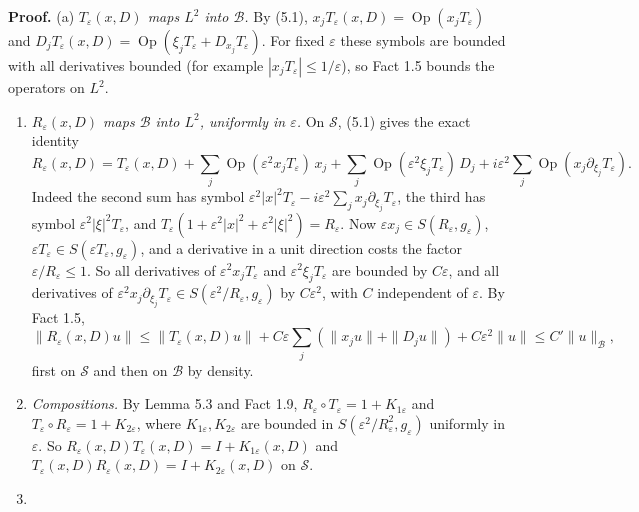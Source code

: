 \documentclass[
  11pt,
]{article}
\begin{document}
\textbf{Proof.} (a) \emph{\(T_\varepsilon(x,D)\) maps \(L^2\) into
\(\mathcal B\).} By (5.1),
\(x_jT_\varepsilon(x,D)=\operatorname{Op}(x_jT_\varepsilon)\) and
\(D_jT_\varepsilon(x,D)=\operatorname{Op}(\xi_jT_\varepsilon+D_{x_j}T_\varepsilon)\).
For fixed \(\varepsilon\) these symbols are bounded with all derivatives
bounded (for example \(|x_jT_\varepsilon|\le1/\varepsilon\)), so Fact
1.5 bounds the operators on \(L^2\).

\begin{enumerate}
\def\labelenumi{(\alph{enumi})}
\setcounter{enumi}{1}
\item
  \emph{\(R_\varepsilon(x,D)\) maps \(\mathcal B\) into \(L^2\),
  uniformly in \(\varepsilon\).} On \(\mathcal S\), (5.1) gives the
  exact identity \[
R_\varepsilon(x,D)=T_\varepsilon(x,D)+\sum_j\operatorname{Op}(\varepsilon^2x_jT_\varepsilon)\,x_j+\sum_j\operatorname{Op}(\varepsilon^2\xi_jT_\varepsilon)\,D_j+i\varepsilon^2\sum_j\operatorname{Op}(x_j\partial_{\xi_j}T_\varepsilon).
\tag{5.2}
\] Indeed the second sum has symbol
  \(\varepsilon^2|x|^2T_\varepsilon-i\varepsilon^2\sum_jx_j\partial_{\xi_j}T_\varepsilon\),
  the third has symbol \(\varepsilon^2|\xi|^2T_\varepsilon\), and
  \(T_\varepsilon(1+\varepsilon^2|x|^2+\varepsilon^2|\xi|^2)=R_\varepsilon\).
  Now \(\varepsilon x_j\in S(R_\varepsilon,g_\varepsilon)\),
  \(\varepsilon T_\varepsilon\in S(\varepsilon T_\varepsilon,g_\varepsilon)\),
  and a derivative in a unit direction costs the factor
  \(\varepsilon/R_\varepsilon\le1\). So all derivatives of
  \(\varepsilon^2x_jT_\varepsilon\) and
  \(\varepsilon^2\xi_jT_\varepsilon\) are bounded by \(C\varepsilon\),
  and all derivatives of
  \(\varepsilon^2x_j\partial_{\xi_j}T_\varepsilon\in S(\varepsilon^2/R_\varepsilon,g_\varepsilon)\)
  by \(C\varepsilon^2\), with \(C\) independent of \(\varepsilon\). By
  Fact 1.5, \[
\|R_\varepsilon(x,D)u\|\le\|T_\varepsilon(x,D)u\|+C\varepsilon\sum_j(\|x_ju\|+\|D_ju\|)+C\varepsilon^2\|u\|\le C'\|u\|_{\mathcal B},
\] first on \(\mathcal S\) and then on \(\mathcal B\) by density.
\item
  \emph{Compositions.} By Lemma 5.3 and Fact 1.9,
  \(R_\varepsilon\circ T_\varepsilon=1+K_{1\varepsilon}\) and
  \(T_\varepsilon\circ R_\varepsilon=1+K_{2\varepsilon}\), where
  \(K_{1\varepsilon},K_{2\varepsilon}\) are bounded in
  \(S(\varepsilon^2/R_\varepsilon^2,g_\varepsilon)\) uniformly in
  \(\varepsilon\). So
  \(R_\varepsilon(x,D)T_\varepsilon(x,D)=I+K_{1\varepsilon}(x,D)\) and
  \(T_\varepsilon(x,D)R_\varepsilon(x,D)=I+K_{2\varepsilon}(x,D)\) on
  \(\mathcal S\).
\item

\end{enumerate}
\end{document}
